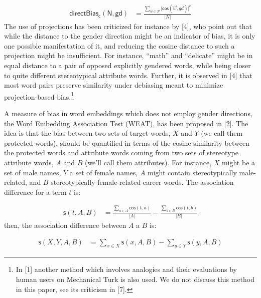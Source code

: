 \documentclass[
  10pt,
  dvipsnames,enabledeprecatedfontcommands, twocolumn]{scrartcl}
\begin{document}
\footnotesize

\begin{align}
\mathsf{directBias_c(N,gd)} & = \frac{\sum_{w\in N}\vert \mathsf{cos}(\vec{w},gd)\vert^c}{\vert N \vert }
\end{align} \normalsize  The use of projections has been criticized for
instance by {[}4{]}, who point out that while the distance to the gender
direction might be an indicator of bias, it is only one possible
manifestation of it, and reducing the cosine distance to such a
projection might be insufficient. For instance, ``math'' and
``delicate'' might be in equal distance to a pair of opposed explicitly
gendered words, while being closer to quite different stereotypical
attribute words. Further, it is observed in {[}4{]} that most word pairs
preserve similarity under debiasing meant to minimize projection-based
bias.\footnote{In {[}1{]} another method which involves analogies and
  their evaluations by human users on Mechanical Turk is also used. We
  do not discuss this method in this paper, see its criticism in
  {[}7{]}.}

A measure of bias in word embeddings which does not employ gender
directions, the Word Embedding Association Test (WEAT), has been
proposed in {[}2{]}. The idea is that the bias between two sets of
target words, \(X\) and \(Y\) (we call them protected words), should be
quantified in terms of the cosine similarity between the protected words
and attribute words coming from two sets of stereotype attribute words,
\(A\) and \(B\) (we'll call them attributes). For instance, \(X\) might
be a set of male names, \(Y\) a set of female names, \(A\) might contain
stereotypically male-related, and \(B\) stereotypically female-related
career words. The association difference for a term \(t\) is:

\vspace{-2mm}

\footnotesize

\begin{align}
\mathsf{s}(t,A,B) & = \frac{\sum_{a\in A}\mathsf{cos}(t,a)}{\vert A\vert} - \frac{\sum_{b\in B}\mathsf{cos}(t,b)}{\vert B\vert}
\end{align} \normalsize \noindent then, the association difference
between \(A\) a \(B\) is:

\vspace{-2mm}

\footnotesize

\begin{align}
\mathsf{s}(X,Y,A,B) & = \sum_{x\in X} \mathsf{s}(x,A,B) -  \sum_{y\in Y} \mathsf{s}(y,A,B)
\end{align} \normalsize
\end{document}

